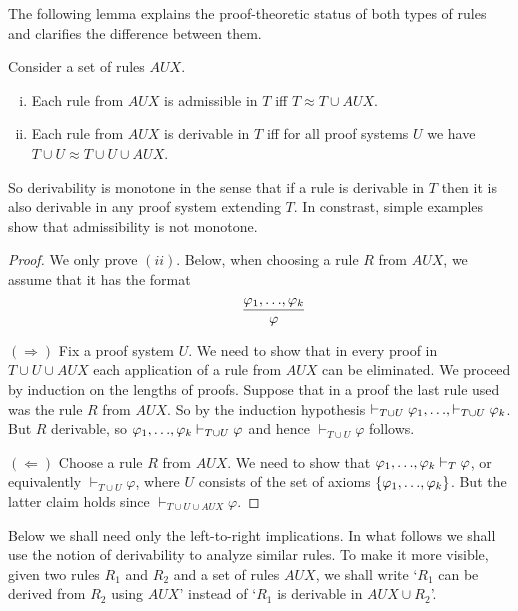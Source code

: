 \documentclass[manuscript, screen, review]{acmart}
\newcommand{\AUX}{\mathit{AUX}}
\begin{document}
The following lemma explains the proof-theoretic status of both types
of rules and clarifies the difference between them.

\begin{lemma} \label{lem:AUX}
  Consider a set of rules $\AUX$.
  \begin{enumerate}[(i)]
  \item 
  Each rule from $\AUX$ is admissible in $T$ iff $T \approx T \cup \AUX$. 

\item Each rule from $\AUX$ is derivable in $T$ iff for all proof
  systems $U$ we have $T \cup U \approx T \cup U \cup \AUX$.

\end{enumerate}
\end{lemma}

So derivability is monotone in the sense that if a rule is derivable
in $T$ then it is also derivable in any proof system extending $T$. In
constrast, simple examples show that admissibility is not monotone.

\begin{proof}
  We only prove $(ii)$.
Below, when choosing a rule $R$ from $\AUX$, we assume that it has the format
\[ 
 \qquad \frac{\varphi_1,\mbox{$\ldots$},\varphi_k}{\varphi}
\]

\III

\NI
$(\Rightarrow)$ Fix a proof system $U$.  We need to show that in every
proof in $T \cup U \cup \AUX$ each application of a rule from $\AUX$
can be eliminated.  We proceed by induction on the lengths of
proofs. Suppose that in a proof the last rule used was the rule $R$ from $\AUX$.
So by the induction hypothesis
$ \vdash_{T \cup U} \varphi_1, \mbox{$\ldots$}, \vdash_{T \cup U} \varphi_k$.  But $R$
derivable, so 
$\varphi_1, \mbox{$\ldots$}, \varphi_k \vdash_{T \cup U} \varphi$ and hence
$\vdash_{T \cup U} \varphi$ follows.

\III

\NI
$(\Leftarrow)$ Choose a rule $R$ from $\AUX$.
We need to show that
$\varphi_1, \mbox{$\ldots$}, \varphi_k \vdash_T \varphi$, or equivalently
$\vdash_{T \cup U} \varphi$, where $U$ consists of the set of axioms
$\mbox{$\{{\varphi_1,\mbox{$\ldots$},\varphi_k}\}$}$.  But the latter claim holds since
$\vdash_{T \cup U \cup \AUX} \varphi$.
\end{proof}

Below we shall need only the left-to-right implications.  In what
follows we shall use the notion of derivability to analyze similar
rules. To make it more visible, given two rules $R_1$ and $R_2$ and a
set of rules $\AUX$, we shall write `$R_1$ can be derived from $R_2$
using $\AUX$' instead of `$R_1$ is derivable in $\AUX \cup R_2$'.
\end{document}
